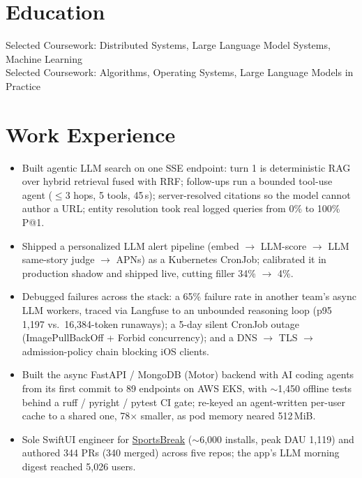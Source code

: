 \documentclass[11pt, letterpaper]{article}
\begin{document}

\section{Education}
Selected Coursework: Distributed Systems, Large Language Model Systems, Machine Learning\\[1pt]
Selected Coursework: Algorithms, Operating Systems, Large Language Models in Practice

\section{Work Experience}
\begin{itemize}
  \item Built agentic LLM search on one SSE endpoint: turn 1 is deterministic RAG over hybrid retrieval fused with RRF; follow-ups run a bounded tool-use agent ($\le$3 hops, 5 tools, 45\,s); server-resolved citations so the model cannot author a URL; entity resolution took real logged queries from 0\% to 100\% P@1.
  \item Shipped a personalized LLM alert pipeline (embed $\to$ LLM-score $\to$ LLM same-story judge $\to$ APNs) as a Kubernetes CronJob; calibrated it in production shadow and shipped live, cutting filler 34\% $\to$ 4\%.
  \item Debugged failures across the stack: a 65\% failure rate in another team's async LLM workers, traced via Langfuse to an unbounded reasoning loop (p95 1{,}197 vs.\ 16{,}384-token runaways); a 5-day silent CronJob outage (ImagePullBackOff + Forbid concurrency); and a DNS $\to$ TLS $\to$ admission-policy chain blocking iOS clients.
  \item Built the async FastAPI / MongoDB (Motor) backend with AI coding agents from its first commit to 89 endpoints on AWS EKS, with $\sim$1{,}450 offline tests behind a ruff / pyright / pytest CI gate; re-keyed an agent-written per-user cache to a shared one, 78$\times$ smaller, as pod memory neared 512\,MiB.
  \item Sole SwiftUI engineer for \href{https://apps.apple.com/app/id6762649287}{SportsBreak} ($\sim$6{,}000 installs, peak DAU 1{,}119) and authored 344 PRs (340 merged) across five repos; the app's LLM morning digest reached 5{,}026 users.
\end{itemize}
\end{document}
